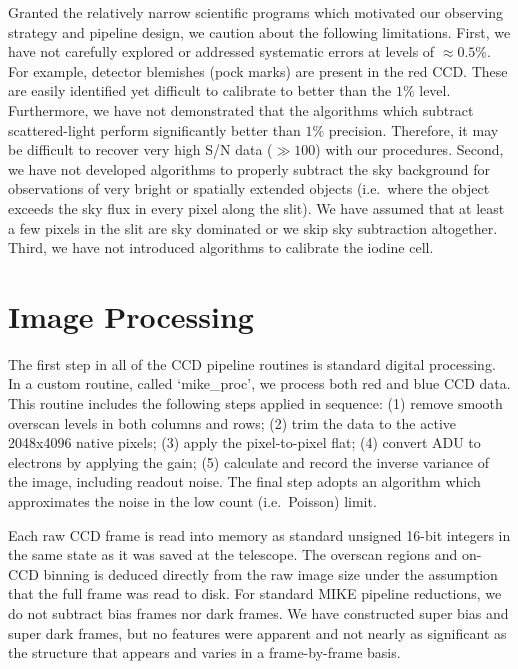 \documentclass[]{emulateapj}
\begin{document}
Granted the relatively narrow scientific programs which
motivated our observing strategy and pipeline design,
we caution about the following limitations.
First, we have not carefully explored or addressed 
systematic errors at levels of $\approx 0.5\%$.
For example, detector blemishes (pock marks) are present in 
the red CCD.  These are easily identified yet difficult to
calibrate to better than the $1\%$ level.  Furthermore,
we have not demonstrated that the algorithms which subtract
scattered-light perform significantly better than $1\%$ precision.
Therefore, it may be difficult to recover very high S/N data
($\gg 100$) with our procedures.
Second, we have not developed algorithms to properly subtract
the sky background for observations of very bright
or spatially extended objects (i.e.\ where the object 
exceeds the sky flux in every pixel along the slit).
We have assumed that at least a few pixels in the slit are
sky dominated or we skip sky subtraction altogether.
Third, we have not introduced algorithms to calibrate
the iodine cell. %


\section{Image Processing}
\label{sec:proc}

The first step in all of the CCD pipeline routines is standard
digital processing.  In a custom routine, called `mike\_proc',
we process both red and blue CCD data. 
This routine includes the following steps applied in sequence:
(1) remove smooth overscan levels in both columns and rows;
(2) trim the data to the active 2048x4096 native pixels;
(3) apply the pixel-to-pixel flat; %
(4) convert ADU to electrons by applying the gain; 
(5) calculate and record the inverse variance of the image, 
including readout noise. 
The final step adopts an algorithm which 
approximates the noise in the low count (i.e.\ Poisson) limit.

Each raw CCD frame is read into memory as standard unsigned 16-bit integers 
in the same state as it was saved at the telescope.  The overscan regions
and on-CCD binning is deduced directly from the raw image size
under the assumption that the full frame was read to disk.
For standard MIKE pipeline reductions, we do not subtract bias frames nor
dark frames.  We have constructed super bias and super dark frames, but no
features were apparent and not nearly as significant as the structure that
appears and varies in a frame-by-frame basis.  
\end{document}
